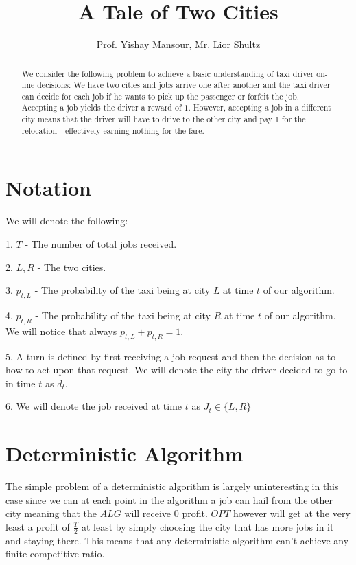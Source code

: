 \documentclass[]{article}
\title{A Tale of Two Cities}
\author{Prof. Yishay Mansour, Mr. Lior Shultz}
\begin{document}
\maketitle

\begin{abstract}

We consider the following problem to achieve a basic understanding of taxi driver on-line decisions:
	We have two cities and jobs arrive one after another and the taxi driver can decide for each job if he wants to pick up the passenger or forfeit the job.
	Accepting a job yields the driver a reward of $ 1 $. However, accepting a job in a different city means that the driver will have to drive to the other city and pay $ 1 $ for the relocation - effectively earning nothing for the fare.

\end{abstract}

\section{Notation}

We will denote the following:

1. $ T $ - The number of total jobs received.

2. $ L , R $ - The two cities.

3. $ p_{t,L} $ - The probability of the taxi being at city $ L $ at time $ t $ of our algorithm.

4. $ p_{t,R} $ - The probability of the taxi being at city $ R $ at time $ t $ of our algorithm. We will notice that always $ p_{t,L} + p_{t,R} = 1 $.

5. A turn is defined by first receiving a job request and then the decision as to how to act upon that request. We will denote the city the driver decided to go to in time $ t $ as $ d_t $.

6. We will denote the job received at time $ t $ as $ J_t \in \{L,R\} $ 

\section{Deterministic Algorithm}

The simple problem of a deterministic algorithm is largely uninteresting in this case since we can at each point in the algorithm a job can hail from the other city meaning that the $ ALG $ will receive $ 0 $ profit. $ OPT $ however will get at the very least a profit of $ \frac{T}{2} $ at least by simply choosing the city that has more jobs in it and staying there. This means that any deterministic algorithm can't achieve any finite competitive ratio.
\end{document}
